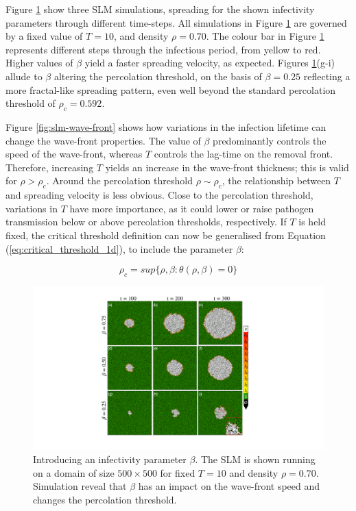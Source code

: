Figure \ref{fig:slm} show three SLM simulations, spreading for the shown infectivity parameters through different time-steps.
All simulations in Figure \ref{fig:slm} are governed by a fixed value of $T=10$, and density $\rho=0.70$.
The colour bar in Figure \ref{fig:slm} represents different steps through the infectious period, from yellow to red.
Higher values of $\beta$ yield a faster spreading velocity,
as expected.
Figures \ref{fig:slm}(g-i) allude to $\beta$ altering the percolation threshold, on the basis of $\beta=0.25$ reflecting a more fractal-like spreading pattern, even well beyond the standard percolation threshold of $\rho_c=0.592$.


Figure \ref{fig:slm-wave-front} shows how variations in the infection lifetime can change the wave-front properties. 
The value of $\beta$ predominantly controls the speed of the wave-front, whereas $T$ controls the lag-time on the removal front. 
Therefore, increasing $T$ yields an increase in the wave-front thickness;
this is valid for $\rho > \rho_c$.
Around the percolation threshold $\rho \sim \rho_c$, the relationship between $T$ and spreading velocity is less obvious. 
Close to the percolation threshold, variations in $T$ have more importance, as it could lower or raise pathogen transmission below or above percolation thresholds, respectively.
If $T$ is held fixed, the critical threshold definition can now be generalised from Equation (\ref{eq:critical_threshold_1d}), to include the parameter $\beta$: 

\begin{equation}
\label{eq:critical_threshold_1d}
    \rho _{c}=sup \lbrace \rho, \beta : \theta (\rho, \beta ) = 0 \rbrace
\end{equation}

\begin{figure}
    \centering
    \includegraphics[scale=0.45]{chapter3/figures/figure3-two-param-model.pdf}
    \caption{Introducing an infectivity parameter $\beta$. The SLM is shown running on a domain of size $500\times500$ for fixed $T=10$ and density $\rho=0.70$. Simulation reveal that $\beta$ has an impact on the wave-front speed and changes the percolation threshold.}
    \label{fig:slm}
\end{figure}

